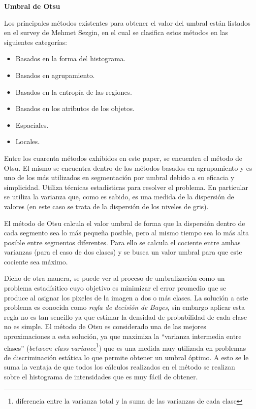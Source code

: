 \textbf{Umbral de Otsu}

Los principales métodos existentes para obtener el valor del umbral están listados en el survey de Mehmet Sezgin\cite{surveyThreshold}, en el cual se clasifica estos métodos en las siguientes categorías:
\begin{itemize}
\item Basados en la forma del histograma.
\item Basados en agrupamiento.
\item Basados en la entropía de las regiones.
\item Basados en los atributos de los objetos.
\item Espaciales.
\item Locales.
\end{itemize}

Entre los cuarenta métodos exhibidos en este paper, se encuentra el método de Otsu\cite{otsu}. El mismo se encuentra dentro de los métodos basados en agrupamiento y es uno de los más utilizados en segmentación por umbral debido a su eficacia y simplicidad. Utiliza técnicas estadísticas para resolver el problema. En particular se utiliza la varianza que, como es sabido, es una medida de la dispersión de valores (en este caso se trata de la dispersión de los niveles de gris).

El método de Otsu\cite{otsu} calcula el valor umbral de forma que la dispersión dentro de cada segmento sea lo más pequeña posible, pero al mismo tiempo sea lo más alta posible entre segmentos diferentes. Para ello se calcula el cociente entre ambas varianzas (para el caso de dos clases) y se busca un valor umbral para que este cociente sea máximo.

Dicho de otra manera, se puede ver al proceso de umbralización como un problema estadísitico cuyo objetivo es minimizar el error promedio que se produce al asignar los pixeles de la imagen a dos o más clases. La solución a este problema es conocida como \textit{regla de decisión de Bayes\cite{bayes}}, sin embargo aplicar esta regla no es tan sencillo ya que estimar la densidad de probabilidad de cada clase no es simple. El método de Otsu\cite{otsu} es considerado una de las mejores aproximaciones a esta solución, ya que maximiza la ``varianza intermedia entre clases'' (\textit{between class variance}\footnote{diferencia entre la varianza total y la suma de las varianzas de cada clase\cite{betweenvarianze}}) que es una medida muy utilizada en problemas de discriminación estática lo que permite obtener un umbral óptimo. A esto se le suma la ventaja de que todos los cálculos realizados en el método se realizan sobre el histograma de intensidades que es muy fácil de obtener.


